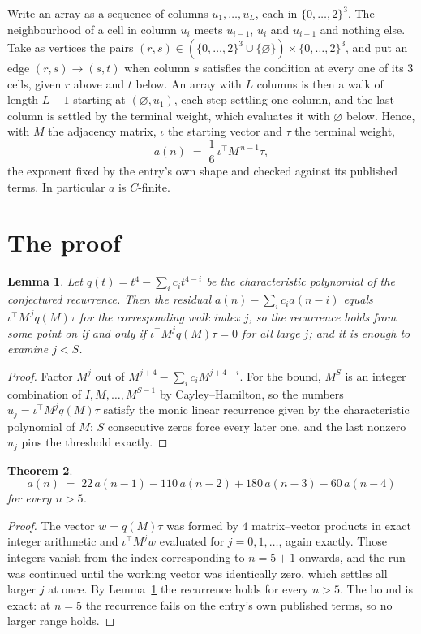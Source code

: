 \documentclass[11pt,a4paper]{article}
\theoremstyle{plain}
\newtheorem{theorem}{Theorem}
\newtheorem{lemma}[theorem]{Lemma}
\theoremstyle{definition}
\begin{document}
Write an array as a sequence of columns $u_1,\dots,u_L$, each in
$\{0,\dots,2\}^{3}$. The neighbourhood of a cell in column $u_i$ meets $u_{i-1}$,
$u_i$ and $u_{i+1}$ and nothing else. Take as vertices the pairs
$(r,s)\in(\{0,\dots,2\}^{3}\cup\{\varnothing\})\times\{0,\dots,2\}^{3}$,
and put an edge $(r,s)\to(s,t)$ when column $s$ satisfies the condition at every one of its
$3$ cells, given $r$ above and $t$ below. An array with $L$ columns is then a walk of length
$L-1$ starting at $(\varnothing,u_1)$, each step settling one column, and the last column is
settled by the terminal weight, which evaluates it with $\varnothing$ below. Hence,
with $M$ the adjacency matrix, $\iota$ the starting vector and $\tau$ the terminal weight,
\[
a(n)\;=\;\frac{1}{6}\,\iota^{\!\top}M^{\,n-1}\tau ,
\]
the exponent fixed by the entry's own shape and checked against its published terms. In
particular $a$ is $C$-finite.

\section{The proof}

\begin{lemma}\label{lem:crit}
Let $q(t)=t^{4}-\sum_i c_it^{4-i}$ be the characteristic polynomial of the
conjectured recurrence. Then the residual $a(n)-\sum_ic_ia(n-i)$ equals
$\iota^{\!\top}M^{\,j}q(M)\tau$ for the corresponding walk index $j$, so the
recurrence holds from some point on if and only if $\iota^{\!\top}M^{j}q(M)\tau=0$ for all
large $j$; and it is enough to examine $j<S$.
\end{lemma}

\begin{proof}
Factor $M^{j}$ out of $M^{j+4}-\sum_ic_iM^{j+4-i}$. For the bound, $M^{S}$
is an integer combination of $I,M,\dots,M^{S-1}$ by Cayley--Hamilton, so the numbers
$u_j=\iota^{\!\top}M^{j}q(M)\tau$ satisfy the monic linear recurrence given by the
characteristic polynomial of $M$; $S$ consecutive zeros force every later one, and the last
nonzero $u_j$ pins the threshold exactly.
\end{proof}

\begin{theorem}
\[
a(n)\;=\;22\,a(n-1) - 110\,a(n-2) + 180\,a(n-3) - 60\,a(n-4)
\]
for every $n>5$.
\end{theorem}

\begin{proof}
The vector $w=q(M)\tau$ was formed by $4$ matrix--vector products in exact integer
arithmetic and $\iota^{\!\top}M^{j}w$ evaluated for $j=0,1,\dots$, again exactly. Those
integers vanish from the index corresponding to $n=5+1$ onwards, and the run was
continued until the working vector was identically zero, which settles all larger $j$ at once.
By Lemma~\ref{lem:crit} the recurrence holds for every $n>5$. The bound is exact: at $n=5$ the recurrence fails on the entry's own published terms, so no larger range holds.
\end{proof}
\end{document}
